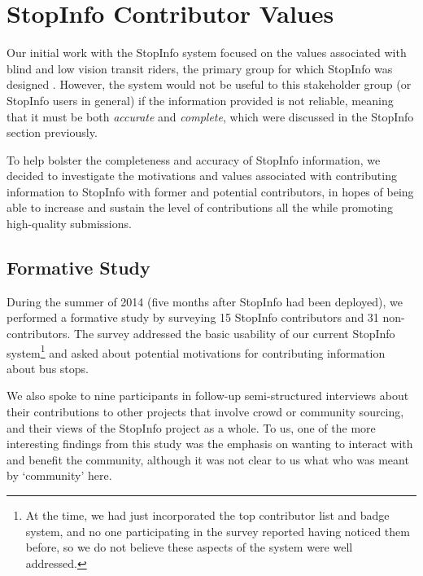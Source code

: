 \section{StopInfo Contributor Values}
\label{sec:contributor-values}

Our initial work with the StopInfo system focused on the values associated with blind and low vision transit riders, the primary group for which StopInfo was designed \cite{campbell-2014}. However, the system would not be useful to this stakeholder group (or StopInfo users in general) if the information provided is not reliable, meaning that it must be both \emph{accurate} and \emph{complete}, which were discussed in the StopInfo section previously.

To help bolster the completeness and accuracy of StopInfo information, we decided to investigate the motivations and values associated with contributing information to StopInfo with former and potential contributors, in hopes of being able to increase and sustain the level of contributions all the while promoting high-quality submissions.   

\subsection{Formative Study}
During the summer of 2014 (five months after StopInfo had been deployed), we performed a formative study by surveying 15 StopInfo contributors and 31 non-contributors. The survey addressed the basic usability of our current StopInfo system\footnote{At the time, we had just incorporated the top contributor list and badge system, and no one participating in the survey reported having noticed them before, so we do not believe these aspects of the system were well addressed.} and asked about potential motivations for contributing information about bus stops. 

We also spoke to nine participants in follow-up semi-structured interviews about their contributions to other projects that involve crowd or community sourcing, and their views of the StopInfo project as a whole. To us, one of the more interesting findings from this study was the emphasis on wanting to interact with and benefit the community, although it was not clear to us what who was meant by `community' here.

